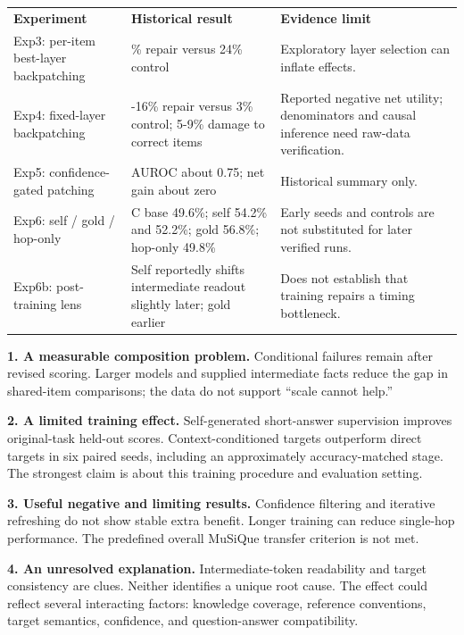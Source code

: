 \documentclass[10pt,a4paper]{article}
\newcommand{\reportheading}[1]{\par\vspace{5pt}{\color{teal}\bfseries\large #1}\par\vspace{2pt}}
\begin{document}
{\small
\begin{tabular}{>{\raggedright\arraybackslash}p{}>{\raggedright\arraybackslash}p{}>{\raggedright\arraybackslash}p{}}
\rowcolor{navy}
\color{white}\bfseries Experiment & \color{white}\bfseries Historical result & \color{white}\bfseries Evidence limit \\
\rowcolor{pale}
Exp3: per-item best-layer backpatching & 37\% repair versus 24\% control & Exploratory layer selection can inflate effects. \\
Exp4: fixed-layer backpatching & 14-16\% repair versus 3\% control; 5-9\% damage to correct items & Reported negative net utility; denominators and causal inference need raw-data verification. \\
\rowcolor{pale}
Exp5: confidence-gated patching & AUROC about 0.75; net gain about zero & Historical summary only. \\
Exp6: self / gold / hop-only & C base 49.6\%; self 54.2\% and 52.2\%; gold 56.8\%; hop-only 49.8\% & Early seeds and controls are not substituted for later verified runs. \\
\rowcolor{pale}
Exp6b: post-training lens & Self reportedly shifts intermediate readout slightly later; gold earlier & Does not establish that training repairs a timing bottleneck. \\
\end{tabular}
}\par\smallskip
\reportheading{What the completed evidence supports}
\textbf{1. A measurable composition problem.} Conditional failures remain after revised scoring. Larger models and supplied intermediate facts reduce the gap in shared-item comparisons; the data do not support ``scale cannot help.''

\textbf{2. A limited training effect.} Self-generated short-answer supervision improves original-task held-out scores. Context-conditioned targets outperform direct targets in six paired seeds, including an approximately accuracy-matched stage. The strongest claim is about this training procedure and evaluation setting.

\textbf{3. Useful negative and limiting results.} Confidence filtering and iterative refreshing do not show stable extra benefit. Longer training can reduce single-hop performance. The predefined overall MuSiQue transfer criterion is not met.

\textbf{4. An unresolved explanation.} Intermediate-token readability and target consistency are clues. Neither identifies a unique root cause. The effect could reflect several interacting factors: knowledge coverage, reference conventions, target semantics, confidence, and question-answer compatibility.
\end{document}
